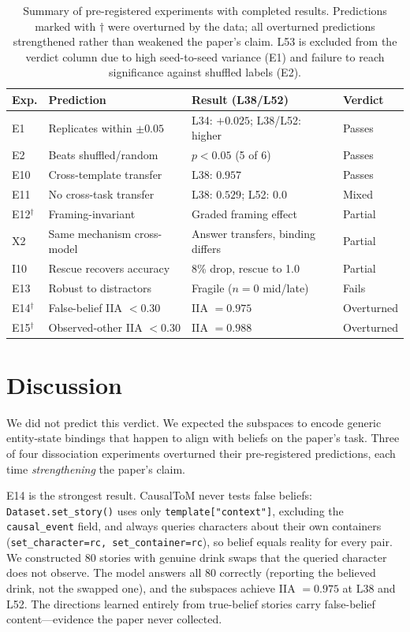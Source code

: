 \documentclass{article}
\begin{document}
\begin{table}[t]
\centering
\caption{Summary of pre-registered experiments with completed results. Predictions marked with $\dagger$ were overturned by the data; all overturned predictions strengthened rather than weakened the paper's claim. L53 is excluded from the verdict column due to high seed-to-seed variance (E1) and failure to reach significance against shuffled labels (E2).}
\label{tab:summary}
\begin{tabular}{lp{3.2cm}p{3.2cm}l}
\toprule
\textbf{Exp.} & \textbf{Prediction} & \textbf{Result (L38/L52)} & \textbf{Verdict} \\
\midrule
E1 & Replicates within $\pm 0.05$ & L34: $+0.025$; L38/L52: higher & Passes \\
E2 & Beats shuffled/random & $p < 0.05$ (5 of 6) & Passes \\
E10 & Cross-template transfer & L38: $0.957$ & Passes \\
E11 & No cross-task transfer & L38: $0.529$; L52: $0.0$ & Mixed \\
E12$^\dagger$ & Framing-invariant & Graded framing effect & Partial \\
X2 & Same mechanism cross-model & Answer transfers, binding differs & Partial \\
I10 & Rescue recovers accuracy & 8\% drop, rescue to 1.0 & Partial \\
E13 & Robust to distractors & Fragile ($n=0$ mid/late) & Fails \\
E14$^\dagger$ & False-belief IIA $< 0.30$ & IIA $= 0.975$ & Overturned \\
E15$^\dagger$ & Observed-other IIA $< 0.30$ & IIA $= 0.988$ & Overturned \\
\bottomrule
\end{tabular}
\end{table}


\section{Discussion}
\label{sec:discussion}

We did not predict this verdict. We expected the subspaces to encode generic entity-state bindings that happen to align with beliefs on the paper's task. Three of four dissociation experiments overturned their pre-registered predictions, each time \emph{strengthening} the paper's claim.

E14 is the strongest result. CausalToM never tests false beliefs: \texttt{Dataset.set\_story()} uses only \texttt{template["context"]}, excluding the \texttt{causal\_event} field, and always queries characters about their own containers (\texttt{set\_character=rc, set\_container=rc}), so belief equals reality for every pair. We constructed 80 stories with genuine drink swaps that the queried character does not observe. The model answers all 80 correctly (reporting the believed drink, not the swapped one), and the subspaces achieve IIA $= 0.975$ at L38 and L52. The directions learned entirely from true-belief stories carry false-belief content---evidence the paper never collected.
\end{document}
